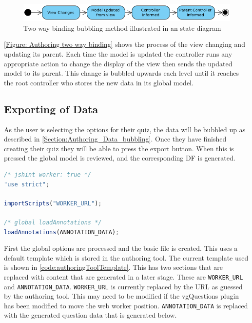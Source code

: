 \begin{figure}[h]
	\centering
		\includegraphics[scale=0.6]{../figures/authoring_tool/two_way_binding.png} 		
	\caption{\label{Figure: Authoring two way binding} Two way binding bubbling method illustrated in an state diagram} 	
\end{figure}

\autoref{Figure: Authoring two way binding} shows the process of the view changing and updating its parent. Each time the model is updated the controller runs any appropriate action to change the display of the view then sends the updated model to its parent. This change is bubbled upwards each level until it reaches the root controller who stores the new data in its global model.

\subsection{Exporting of Data}
\label{Section:Authoring_export_data}

As the user is selecting the options for their quiz, the data will be bubbled up as described in \autoref{Section:Authoring_Data_bubbling}. Once they have finished creating their quiz they will be able to press the export button. When this is pressed the global model is reviewed, and the corresponding \gls{DF} is generated.
\begin{lstlisting}[language=javascript,caption={Base template for authoring tool \gls{DF} generation},label={code:authoringToolTemplate} ]
/* jshint worker: true */
"use strict";

importScripts("WORKER_URL");

/* global loadAnnotations */
loadAnnotations(ANNOTATION_DATA);
\end{lstlisting}

First the global options are processed and the basic file is created. This uses a default template which is stored in the authoring tool. The current template used is shown in \autoref{code:authoringToolTemplate}. This has two sections that are replaced with content that are generated in a later stage. These are \lstinline|WORKER_URL| and \lstinline|ANNOTATION_DATA|. \lstinline|WORKER_URL| is currently replaced by the URL as guessed by the authoring tool. This may need to be modified if the vgQuestions plugin has been modified to move the web worker position. \lstinline|ANNOTATION_DATA| is replaced with the generated question data that is generated below.

